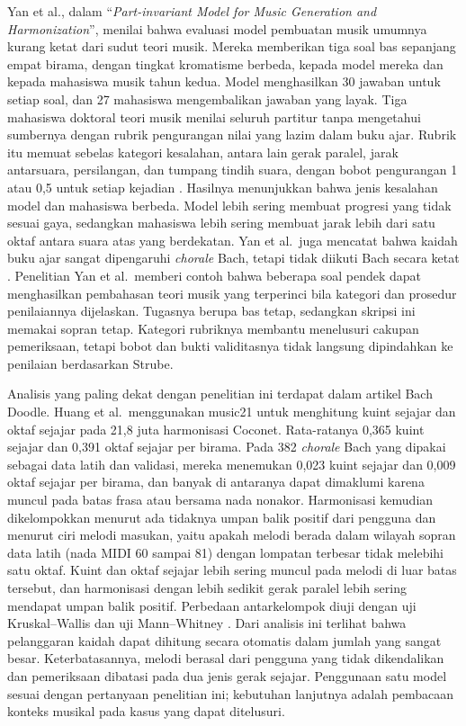 Yan et al., dalam ``\textit{Part-invariant Model for Music Generation and Harmonization}'', menilai bahwa evaluasi model pembuatan musik umumnya kurang ketat dari sudut teori musik. Mereka memberikan tiga soal bas sepanjang empat birama, dengan tingkat kromatisme berbeda, kepada model mereka dan kepada mahasiswa musik tahun kedua. Model menghasilkan 30 jawaban untuk setiap soal, dan 27 mahasiswa mengembalikan jawaban yang layak. Tiga mahasiswa doktoral teori musik menilai seluruh partitur tanpa mengetahui sumbernya dengan rubrik pengurangan nilai yang lazim dalam buku ajar. Rubrik itu memuat sebelas kategori kesalahan, antara lain gerak paralel, jarak antarsuara, persilangan, dan tumpang tindih suara, dengan bobot pengurangan 1 atau 0,5 untuk setiap kejadian \parencite[208--209]{yan2018}. Hasilnya menunjukkan bahwa jenis kesalahan model dan mahasiswa berbeda. Model lebih sering membuat progresi yang tidak sesuai gaya, sedangkan mahasiswa lebih sering membuat jarak lebih dari satu oktaf antara suara atas yang berdekatan. Yan et al.\ juga mencatat bahwa kaidah buku ajar sangat dipengaruhi \textit{chorale} Bach, tetapi tidak diikuti Bach secara ketat \parencite{yan2018}. Penelitian Yan et al.\ memberi contoh bahwa beberapa soal pendek dapat menghasilkan pembahasan teori musik yang terperinci bila kategori dan prosedur penilaiannya dijelaskan. Tugasnya berupa bas tetap, sedangkan skripsi ini memakai sopran tetap. Kategori rubriknya membantu menelusuri cakupan pemeriksaan, tetapi bobot dan bukti validitasnya tidak langsung dipindahkan ke penilaian berdasarkan Strube.

Analisis yang paling dekat dengan penelitian ini terdapat dalam artikel Bach Doodle. Huang et al.\ menggunakan music21 untuk menghitung kuint sejajar dan oktaf sejajar pada 21,8 juta harmonisasi Coconet. Rata-ratanya 0,365 kuint sejajar dan 0,391 oktaf sejajar per birama. Pada 382 \textit{chorale} Bach yang dipakai sebagai data latih dan validasi, mereka menemukan 0,023 kuint sejajar dan 0,009 oktaf sejajar per birama, dan banyak di antaranya dapat dimaklumi karena muncul pada batas frasa atau bersama nada nonakor. Harmonisasi kemudian dikelompokkan menurut ada tidaknya umpan balik positif dari pengguna dan menurut ciri melodi masukan, yaitu apakah melodi berada dalam wilayah sopran data latih (nada MIDI 60 sampai 81) dengan lompatan terbesar tidak melebihi satu oktaf. Kuint dan oktaf sejajar lebih sering muncul pada melodi di luar batas tersebut, dan harmonisasi dengan lebih sedikit gerak paralel lebih sering mendapat umpan balik positif. Perbedaan antarkelompok diuji dengan uji Kruskal--Wallis dan uji Mann--Whitney \parencite[798]{huang2019}. Dari analisis ini terlihat bahwa pelanggaran kaidah dapat dihitung secara otomatis dalam jumlah yang sangat besar. Keterbatasannya, melodi berasal dari pengguna yang tidak dikendalikan dan pemeriksaan dibatasi pada dua jenis gerak sejajar. Penggunaan satu model sesuai dengan pertanyaan penelitian ini; kebutuhan lanjutnya adalah pembacaan konteks musikal pada kasus yang dapat ditelusuri.

